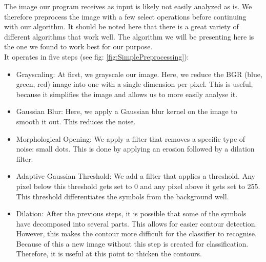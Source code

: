 \documentclass[11pt]{article}
\begin{document}
		The image our program receives as input is likely not easily analyzed as is.
		We therefore preprocess the image with a few select operations before continuing with our algorithm.
		It should be noted here that there is a great variety of different algorithms that work well.
		The algorithm we will be presenting here is the one we found to work best for our purpose.\\
		It operates in five steps (see fig: \ref{fig:SimplePreprocessing}):
		\begin{itemize}
			\item Grayscaling: At first, we grayscale our image.
			Here, we reduce the BGR (blue, green, red) image into one with a single dimension per pixel.
			This is useful, because it simplifies the image and allows us to more easily analyse it.
			\item Gaussian Blur: Here, we apply a Gaussian blur kernel on the image to smooth it out. This reduces the noise.
			\item Morphological Opening: We apply a filter that removes a specific type of noise: small dots. This is done by applying an erosion followed by a dilation filter. %
			\item Adaptive Gaussian Threshold: We add a filter that applies a threshold. 
			Any pixel below this threshold gets set to 0 and any pixel above it gets set to 255. %
			This threshold differentiates the symbols from the background well.
			\item Dilation: After the previous steps, it is possible that some of the symbols have decomposed into several parts.
			This allows for easier contour detection.
			However, this makes the contour more difficult for the classifier to recognise.
			Because of this a new image without this step is created for classification. %
			Therefore, it is useful at this point to thicken the contours.
		\end{itemize}
			
	
\end{document}
